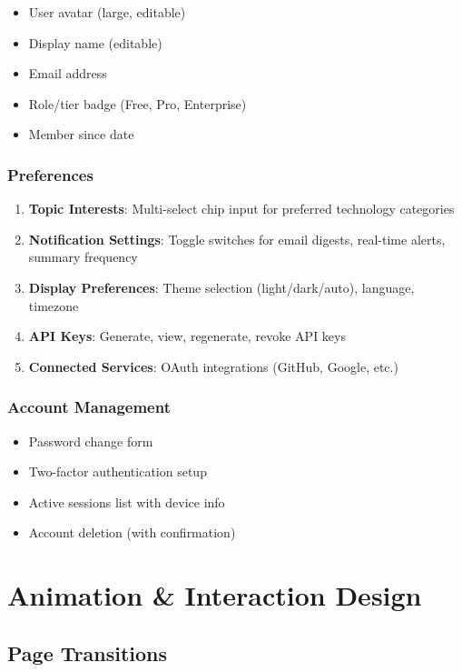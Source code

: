 \documentclass{report}
\begin{document}
\begin{itemize}
    \item User avatar (large, editable)
    \item Display name (editable)
    \item Email address
    \item Role/tier badge (Free, Pro, Enterprise)
    \item Member since date
\end{itemize}

\subsection{Preferences}

\begin{enumerate}
    \item \textbf{Topic Interests}: Multi-select chip input for preferred technology categories
    \item \textbf{Notification Settings}: Toggle switches for email digests, real-time alerts, summary frequency
    \item \textbf{Display Preferences}: Theme selection (light/dark/auto), language, timezone
    \item \textbf{API Keys}: Generate, view, regenerate, revoke API keys
    \item \textbf{Connected Services}: OAuth integrations (GitHub, Google, etc.)
\end{enumerate}

\subsection{Account Management}

\begin{itemize}
    \item Password change form
    \item Two-factor authentication setup
    \item Active sessions list with device info
    \item Account deletion (with confirmation)
\end{itemize}

\chapter{Animation \& Interaction Design}

\section{Page Transitions}
\end{document}
